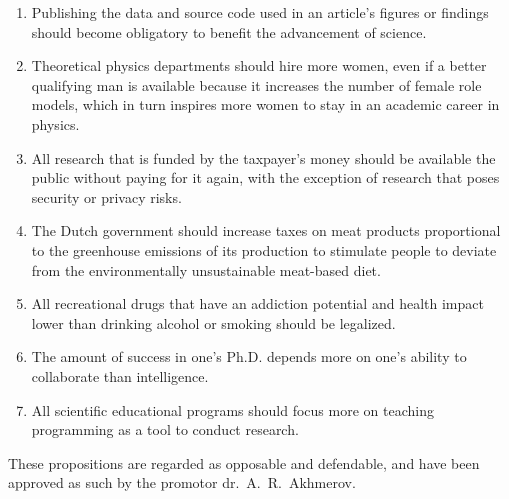 \documentclass{dissertation}
\begin{document}
\begin{enumerate}
\item Publishing the data and source code used in an article's figures or findings should become obligatory to benefit the advancement of science.

\item Theoretical physics departments should hire more women, even if a better qualifying man is available because it increases the number of female role models, which in turn inspires more women to stay in an academic career in physics.

\item All research that is funded by the taxpayer's money should be available the public without paying for it again, with the exception of research that poses security or privacy risks.

\item The Dutch government should increase taxes on meat products proportional to the greenhouse emissions of its production to stimulate people to deviate from the environmentally unsustainable meat-based diet.

\item All recreational drugs that have an addiction potential and health impact lower than drinking alcohol or smoking should be legalized.

\item The amount of success in one's Ph.D. depends more on one's ability to collaborate than intelligence.

\item All scientific educational programs should focus more on teaching programming as a tool to conduct research.

\end{enumerate}

\bigskip
\bigskip

\begin{center}
These propositions are regarded as opposable and defendable, and have been approved as such by the promotor  dr.\ A.\ R.\ Akhmerov.
\end{center}
\end{document}
